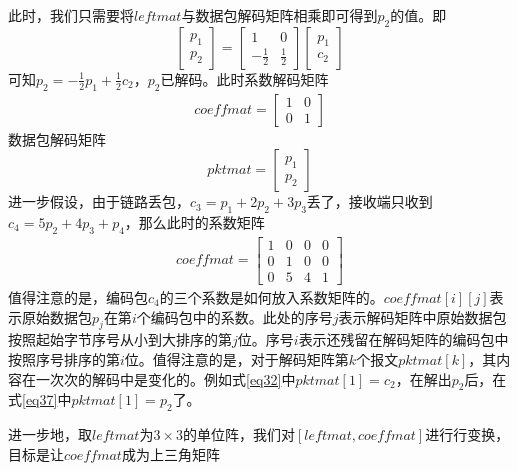 此时，我们只需要将$leftmat$与数据包解码矩阵相乘即可得到$p_{2}$的值。即
\begin{equation}\label{eq35}
\left[ {\begin{array}{*{20}{c}}
	{{p_1}}\\
	{{p_2}}
	\end{array}} \right] = \left[ {\begin{array}{*{20}{c}}
	1&0\\
	{ - \frac{1}{2}}&{\frac{1}{2}}
	\end{array}} \right]\left[ {\begin{array}{*{20}{c}}
	{{p_1}}\\
	{{c_2}}
	\end{array}} \right]
\end{equation}
可知$p_{2}=-\frac{1}{2}p_{1}+\frac{1}{2}c_{2}$，$p_{2}$已解码。此时系数解码矩阵
\begin{eqnarray}\label{eq36}
coeffmat=\left[ {\begin{array}{*{20}{c}}
	1&0\\
	0&1
	\end{array}} \right]
\end{eqnarray}
数据包解码矩阵
\begin{equation}\label{eq37}
pktmat = \left[ {\begin{array}{*{20}{c}}
	{{p_1}}\\
	{{p_2}}
	\end{array}} \right]
\end{equation}
进一步假设，由于链路丢包，$c_{3}=p_{1}+2p_{2}+3p_{3}$丢了，接收端只收到$c_{4}=5p_{2}+4p_{3}+p_{4}$，那么此时的系数矩阵
\begin{eqnarray}\label{eq38}
coeffmat=\left[ {\begin{array}{*{20}{c}}
	1&0&0&0\\
	0&1&0&0\\
	0&5&4&1
	\end{array}} \right]
\end{eqnarray}
值得注意的是，编码包$c_{4}$的三个系数是如何放入系数矩阵的。$coeffmat\left[i\right]\left[j\right]$表示原始数据包$p_{j}$在第$i$个编码包中的系数。此处的序号$j$表示解码矩阵中原始数据包按照起始字节序号从小到大排序的第$j$位。序号$i$表示还残留在解码矩阵的编码包中按照序号排序的第$i$位。值得注意的是，对于解码矩阵第$k$个报文$pktmat[k]$，其内容在一次次的解码中是变化的。例如式\ref{eq32}中$pktmat\left[1\right]=c_2$，在解出$p_2$后，在式\ref{eq37}中$pktmat\left[1\right]=p_{2}$了。
\par
进一步地，取$leftmat$为$3 \times 3$的单位阵，我们对$\left[leftmat,coeffmat\right]$进行行变换，目标是让$coeffmat$成为上三角矩阵
